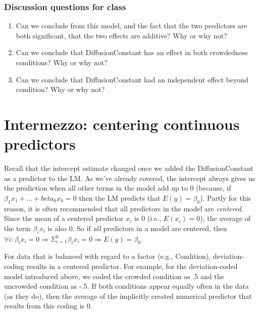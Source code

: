 \documentclass[
]{article}
\providecommand{\tightlist}{%
  \setlength{\itemsep}{0pt}\setlength{\parskip}{0pt}}
\begin{document}
\hypertarget{discussion-questions-for-class-1}{%
\subsubsection{Discussion questions for
class}\label{discussion-questions-for-class-1}}

\begin{enumerate}
\def\labelenumi{\arabic{enumi}.}
\setcounter{enumi}{3}
\tightlist
\item
  Can we conclude from this model, and the fact that the two predictors
  are both significant, that the two effects are additive? Why or why
  not?
\item
  Can we conclude that DiffusionConstant has an effect in both
  crowdedness conditions? Why or why not?
\item
  Can we conclude that DiffusionConstant had an independent effect
  beyond condition? Why or why not?
\end{enumerate}

\hypertarget{intermezzo-centering-continuous-predictors}{%
\section{Intermezzo: centering continuous
predictors}\label{intermezzo-centering-continuous-predictors}}

Recall that the intercept estimate changed once we added the
DiffusionConstant as a predictor to the LM. As we've already covered,
the intercept always gives us the prediction when all other terms in the
model add up to 0 (because, if \(\beta_1 x_1 + ... + beta_k x_k = 0\)
then the LM predicts that \(E(y) = \beta_0\)). Partly for this reason,
it is often recommended that all predictors in the model are
\emph{centered}. Since the mean of a centered predictor \(x_i\) is 0
(i.e., \(E(x_i) = 0\)), the average of the term \(\beta_i x_i\) is also
0. So if \emph{all} predictors in a model are centered, then
\(\forall i: \beta_i x_i = 0 \Rightarrow \Sigma_{i=1}^k \beta_i x_i = 0 \Rightarrow E(y) = \beta_0\).

For data that is balanced with regard to a factor (e.g., Condition),
deviation-coding results in a centered predictor. For example, for the
deviation-coded model introduced above, we coded the crowded condition
as .5 and the uncrowded condition as -.5. If both conditions appear
equally often in the data (as they do), then the average of the
implicitly created numerical predictor that results from this coding is
0.
\end{document}
